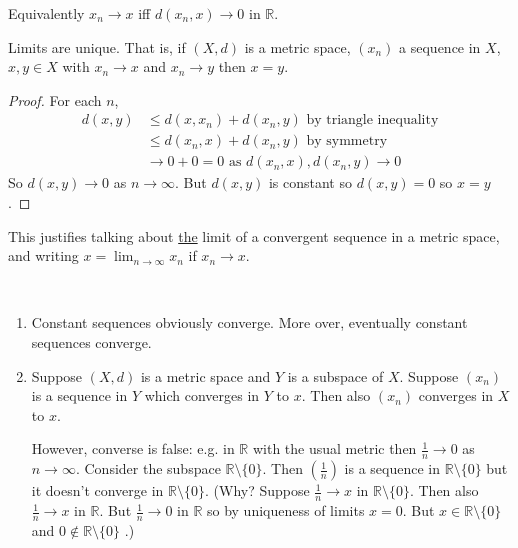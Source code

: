 Equivalently $x_n \to x$ iff $d(x_n, x) \to 0$ in $\mathbb{R}$.

\begin{proposition} \label{prp:15}
    Limits are unique.
    That is, if $(X, d)$ is a metric space, $(x_n)$ a sequence in $X$, $x, y \in X$ with $x_n \to x$ and $x_n \to y$ then $x = y$.
\end{proposition} 

\begin{proof}
    For each $n$, 
    \begin{align*}
        d(x, y) &\leq d(x, x_n) + d(x_n, y) \text{ by triangle inequality} \\
        &\leq d(x_n, x) + d(x_n, y) \text{ by symmetry} \\
        &\to 0 + 0 = 0 \text{ as $d(x_n, x), d(x_n, y) \to 0$}
    \end{align*} 
    So $d(x, y) \to 0$ as $n \to \infty$.
    But $d(x, y)$ is constant so $d(x, y) = 0$ so $x = y$. 
\end{proof} 

\begin{remark}
    This justifies talking about \underline{the} limit of a convergent sequence in a metric space, and writing $x = \lim_{n \to \infty} x_n$ if $x_n \to x$.
\end{remark} 

\begin{remark} \
    \begin{enumerate}
        \item Constant sequences obviously converge. More over, eventually constant sequences converge.
        \item Suppose $(X, d)$ is a metric space and $Y$ is a subspace of $X$.
        Suppose $(x_n)$ is a sequence in $Y$ which converges in $Y$ to $x$.
        Then also $(x_n)$ converges in $X$ to $x$.

        However, converse is false: e.g. in $\mathbb{R}$ with the usual metric then $\frac{1}{n} \to 0$ as $n \to \infty$.
        Consider the subspace $\mathbb{R} \setminus \{0\}$.
        Then $(\frac{1}{n})$ is a sequence in $\mathbb{R} \setminus \{0\}$ but it doesn't converge in $\mathbb{R} \setminus \{0\}$.
        (Why? Suppose $\frac{1}{n} \to x$ in $\mathbb{R} \setminus \{0\}$.
        Then also $\frac{1}{n} \to x$ in $\mathbb{R}$. 
        But $\frac{1}{n} \to 0$ in $\mathbb{R}$ so by uniqueness of limits $x = 0$. But $x \in \mathbb{R} \setminus \{0\}$ and $0 \notin \mathbb{R} \setminus \{0\}$ \Lightning.)
    \end{enumerate} 
\end{remark} 

